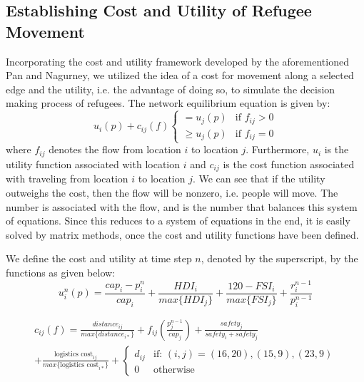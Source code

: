 \documentclass{article}
\begin{document}
\subsection{Establishing Cost and Utility of Refugee Movement}
Incorporating the cost and utility framework developed by the aforementioned Pan and Nagurney, we utilized the idea of a cost for movement along a selected edge and the utility, i.e. the advantage of doing so, to simulate the decision making process of refugees. The network equilibrium equation is given by:
\begin{equation}
    u_i(p)+c_{ij}(f) \begin{cases} =u_j(p) & \mbox{if } f_{ij}>0\\ \geq u_j(p) & \mbox{if } f_{ij}=0 \end{cases}
\end{equation}
where $f_{ij}$ denotes the flow from location $i$ to location $j$. Furthermore, $u_i$ is the utility function associated with location $i$ and $c_{ij}$ is the cost function associated with traveling from location $i$ to location $j$. We can see that if the utility outweighs the cost, then the flow will be nonzero, i.e. people will move. The number is associated with the flow, and is the number that balances this system of equations. Since this reduces to a system of equations in the end, it is easily solved by matrix methods, once the cost and utility functions have been defined.

We define the cost and utility at time step $n$, denoted by the superscript, by the functions as given below:
\begin{equation}
    u_i^n(p) = \frac{cap_i-p_i^n}{cap_i} + \frac{HDI_i}{max\{HDI_j\}} + \frac{120-FSI_i}{max\{FSI_j\}} + \frac{r_i^{n-1}}{p_i^{n-1}}
\end{equation}

\begin{equation}
\begin{split}
    c_{ij}(f) = \frac{distance_{ij}}{max\{distance_{i*}\}} + f_{ij}(\frac{p_j^{n-1}}{cap_j})
    + \frac{safety_j}{safety_i+safety_j} \\
    +\frac{\text{logistics cost}_{ij}}{max\{\text{logistics cost}_{i*}\}} + \begin{cases} d_{ij} & \mbox{if: } (i,j) = (16,20), (15,9), (23,9) \\ 0 & \mbox{otherwise} \end{cases}
\end{split}
\end{equation}
\end{document}
